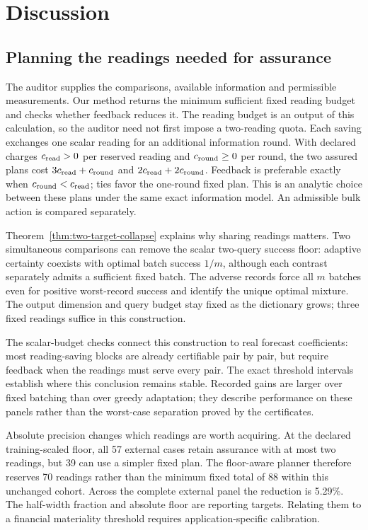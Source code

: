 \documentclass[12pt]{article}
\begin{document}
\section{Discussion}
\subsection{Planning the readings needed for assurance}
The auditor supplies the comparisons, available information and permissible
measurements. Our method returns the minimum sufficient fixed reading budget
and checks whether feedback reduces it. The reading budget is an output of this calculation, so the auditor need
not first impose a two-reading quota. Each saving exchanges one scalar
reading for an additional information round. With declared charges
$c_{\rm read}>0$ per reserved reading and $c_{\rm round}\geq0$ per
round, the two assured plans cost $3c_{\rm read}+c_{\rm round}$ and
$2c_{\rm read}+2c_{\rm round}$. Feedback is preferable exactly when
$c_{\rm round}<c_{\rm read}$; ties favor the one-round fixed plan.
This is an analytic choice between these plans under the same exact
information model. An admissible bulk action is compared separately.

Theorem~\ref{thm:two-target-collapse} explains why sharing readings matters.
Two simultaneous comparisons can remove the scalar two-query success floor:
adaptive certainty coexists with optimal batch success $1/m$, although each
contrast separately admits a sufficient fixed batch. The adverse records
force all $m$ batches even for positive worst-record success and identify the
unique optimal mixture. The output dimension and query budget stay fixed as
the dictionary grows; three fixed readings suffice in this construction.

The scalar-budget checks connect this construction to real forecast
coefficients: most reading-saving blocks are already certifiable pair by
pair, but require feedback when the readings must serve every pair.
The exact threshold intervals establish where this conclusion remains
stable. Recorded gains are larger over fixed batching than over greedy
adaptation; they describe performance on these panels rather than the
worst-case separation proved by the certificates.

Absolute precision changes which readings are worth acquiring. At the
declared training-scaled floor, all 57 external cases retain assurance with
at most two readings, but 39 can use a simpler fixed plan. The floor-aware
planner therefore reserves 70 readings rather than the minimum fixed total
of 88 within this unchanged cohort. Across the complete external panel the
reduction is 5.29\%. The half-width fraction and absolute floor are
reporting targets. Relating them to a financial materiality threshold
requires application-specific calibration.
\end{document}
